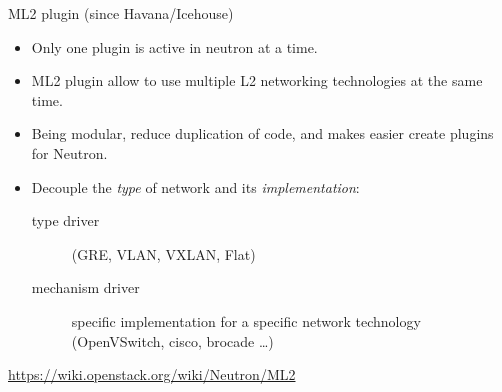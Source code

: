 \documentclass[english,serif,mathserif,xcolor=pdftex,dvipsnames,table]{beamer}
\begin{document}


\begin{frame}
  {ML2 plugin (since Havana/Icehouse)}
  \begin{itemize}
  \item Only one plugin is active in neutron at a time.
  \item ML2 plugin allow to use multiple L2 networking technologies at the
    same time.
  \item Being modular, reduce duplication of code, and makes easier create
    plugins for Neutron.

  \item Decouple the \textit{type} of network and its \textit{implementation}:
    \begin{description}
    \item[type driver] (GRE, VLAN, VXLAN, Flat)
    \item[mechanism driver] specific implementation for a specific
      network technology (OpenVSwitch, cisco, brocade \ldots)
    \end{description}
  \end{itemize}
\+
{\footnotesize\url{https://wiki.openstack.org/wiki/Neutron/ML2}}
\end{frame}
\end{document}

